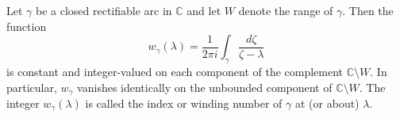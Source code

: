 Let $\gamma$ be a closed rectifiable arc in $\mathbb{C}$ and let $W$ denote the range of $\gamma$. Then the function
$$w_{\gamma}(\lambda) = \frac{1}{2\pi i} \int_{\gamma} \frac{d\zeta}{\zeta - \lambda}$$
is constant and integer-valued on each component of the complement $\mathbb{C} \setminus W$. In particular, $w_{\gamma}$ vanishes identically on the unbounded component of $\mathbb{C} \setminus W$. The integer $w_{\gamma}(\lambda)$ is called the index or winding number of $\gamma$ at (or about) $\lambda$.

